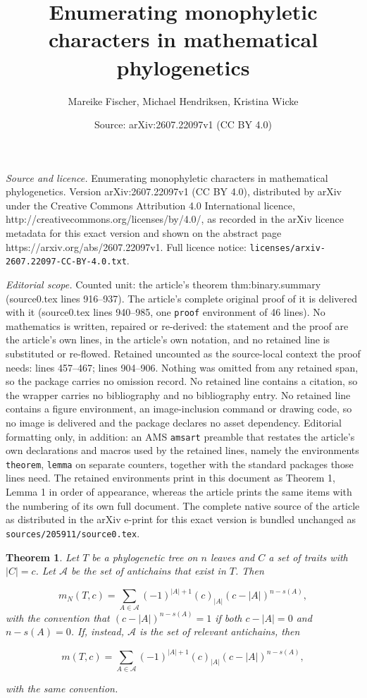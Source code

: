 \documentclass[10pt,a4paper]{amsart}
\title{Enumerating monophyletic characters in mathematical phylogenetics}
\author{Mareike Fischer, Michael Hendriksen, Kristina Wicke}
\date{Source: arXiv:2607.22097v1 (CC BY 4.0)}
\newtheorem{theorem}{Theorem}
\begin{document}
\maketitle

\noindent\emph{Source and licence.} Enumerating monophyletic characters in mathematical phylogenetics. Version arXiv:2607.22097v1 (CC BY 4.0), distributed by arXiv under the Creative Commons Attribution 4.0 International licence, http://creativecommons.org/licenses/by/4.0/, as recorded in the arXiv licence metadata for this exact version and shown on the abstract page https://arxiv.org/abs/2607.22097v1. Full licence notice: \texttt{licenses/arxiv-2607.22097-CC-BY-4.0.txt}.\par\smallskip

\noindent\textit{Editorial scope.} Counted unit: the article's theorem thm:binary.summary (source0.tex lines 916--937). The article's complete original proof of it is delivered with it (source0.tex lines 940--985, one \texttt{proof} environment of 46 lines). No mathematics is written, repaired or re-derived: the statement and the proof are the article's own lines, in the article's own notation, and no retained line is substituted or re-flowed.  Retained uncounted as the source-local context the proof needs: lines 457--467; lines 904--906.  Nothing was omitted from any retained span, so the package carries no omission record.  No retained line contains a citation, so the wrapper carries no bibliography and no bibliography entry.  No retained line contains a figure environment, an image-inclusion command or drawing code, so no image is delivered and the package declares no asset dependency.  Editorial formatting only, in addition: an AMS \texttt{amsart} preamble that restates the article's own declarations and macros used by the retained lines, namely the environments \texttt{theorem}, \texttt{lemma} on separate counters, together with the standard packages those lines need.  The retained environments print in this document as Theorem 1, Lemma 1 in order of appearance, whereas the article prints the same items with the numbering of its own full document.  The complete native source of the article as distributed in the arXiv e-print for this exact version is bundled unchanged as \texttt{sources/205911/source0.tex}.
\begin{theorem}
\label{thm:gen.theorem}
    Let $T$ be a phylogenetic tree on $n$ leaves and $C$ a set of traits with $|C|=c$. Let $\mathcal{A}$ be the set of antichains that exist in $T$. Then

    \[m_N(T,c) = \sum_{A \in \mathcal{A}} (-1)^{|A|+1} (c)_{|A|} (c-|A|)^{n-s(A)},\]
with the convention that $(c-|A|)^{n-s(A)}=1$ if both $c-|A|=0$ and $n-s(A)=0$. If, instead, $\mathcal{A}$ is the set of relevant antichains, then 

\[m(T,c) = \sum_{A \in \mathcal{A}} (-1)^{|A|+1} (c)_{|A|} (c-|A|)^{n-s(A)},\]

with the same convention.
\end{theorem}
\end{document}
